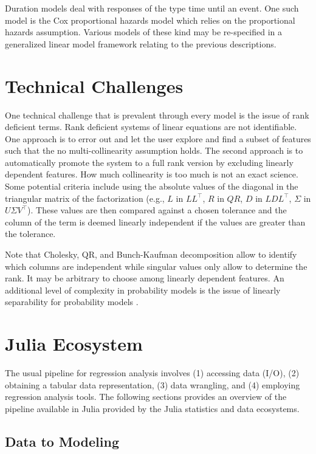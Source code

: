 \documentclass{juliacon}
\begin{document}
Duration models deal with responses of the type time until an event. One such model is the Cox proportional hazards model which relies on the proportional hazards assumption. Various models of these kind may be re-specified in a generalized linear model framework relating to the previous descriptions.

\section{Technical Challenges}

One technical challenge that is prevalent through every model is the issue of rank deficient terms. Rank deficient systems of linear equations are not identifiable. One approach is to error out and let the user explore and find a subset of features such that the no multi-collinearity assumption holds. The second approach is to automatically promote the system to a full rank version by excluding linearly dependent features. How much collinearity is too much is not an exact science. Some potential criteria include using the absolute values of the diagonal in the triangular matrix of the factorization (e.g., $L$ in $LL^{\top}$, $R$ in $QR$, $D$ in $LDL^{\top}$, $\Sigma$ in $U\Sigma V^{\top}$). These values are then compared against a chosen tolerance and the column of the term is deemed linearly independent if the values are greater than the tolerance.

Note that Cholesky, QR, and Bunch-Kaufman decomposition allow to identify which columns are independent while singular values only allow to determine the rank. It may be arbitrary to choose among linearly dependent features. An additional level of complexity in probability models is the issue of linearly separability for probability models \cite{Konis_2007}.

\section{Julia Ecosystem}

The usual pipeline for regression analysis involves (1) accessing data (I/O), (2) obtaining a tabular data representation, (3) data wrangling, and (4) employing regression analysis tools. The following sections provides an overview of the pipeline available in Julia provided by the Julia statistics and data ecosystems.

\subsection{Data to Modeling}
\end{document}
